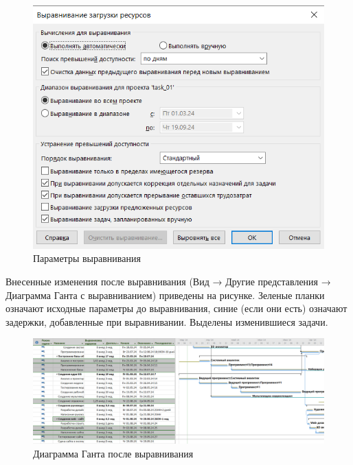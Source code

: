\begin{figure}[h!]
	\begin{center}
		\includegraphics[scale=0.8]{inc/img/p_2.png}
	\end{center}
	\captionsetup{justification=centering}
	\caption{Параметры выравнивания}
	\label{fig:u3}
\end{figure}

Внесенные изменения после выравнивания (Вид → Другие представления → Диаграмма Ганта с выравниванием) приведены на рисунке. Зеленые планки означают исходные параметры до выравнивания, синие (если они есть) означают задержки, добавленные при выравнивании. Выделены
изменившиеся задачи.

\begin{figure}[h!]
	\begin{center}
		\includegraphics[scale=0.34]{inc/img/p_3.png}
	\end{center}
	\captionsetup{justification=centering}
	\caption{Диаграмма Ганта после выравнивания}
	\label{fig:u3}
\end{figure}

